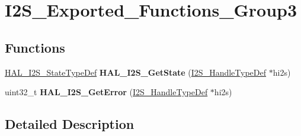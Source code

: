 \hypertarget{group___i2_s___exported___functions___group3}{}\section{I2\+S\+\_\+\+Exported\+\_\+\+Functions\+\_\+\+Group3}
\label{group___i2_s___exported___functions___group3}
\subsection*{Functions}
\begin{DoxyCompactItemize}
\item 
\mbox{\label{group___i2_s___exported___functions___group3_ga575e5ecf94a8a288b8a07e034dcb18c8}} 
\hyperlink{group___i2_s___exported___types_ga2588a0c71baf7cd6d2c1b9b11120bef0}{H\+A\+L\+\_\+\+I2\+S\+\_\+\+State\+Type\+Def} {\bfseries H\+A\+L\+\_\+\+I2\+S\+\_\+\+Get\+State} (\hyperlink{group___i2_s___exported___types_ga859f888192a094b456619601937580f5}{I2\+S\+\_\+\+Handle\+Type\+Def} $\ast$hi2s)
\item 
\mbox{\label{group___i2_s___exported___functions___group3_ga222caea98be140449fc5c4a0f21efbd0}} 
uint32\+\_\+t {\bfseries H\+A\+L\+\_\+\+I2\+S\+\_\+\+Get\+Error} (\hyperlink{group___i2_s___exported___types_ga859f888192a094b456619601937580f5}{I2\+S\+\_\+\+Handle\+Type\+Def} $\ast$hi2s)
\end{DoxyCompactItemize}


\subsection{Detailed Description}
